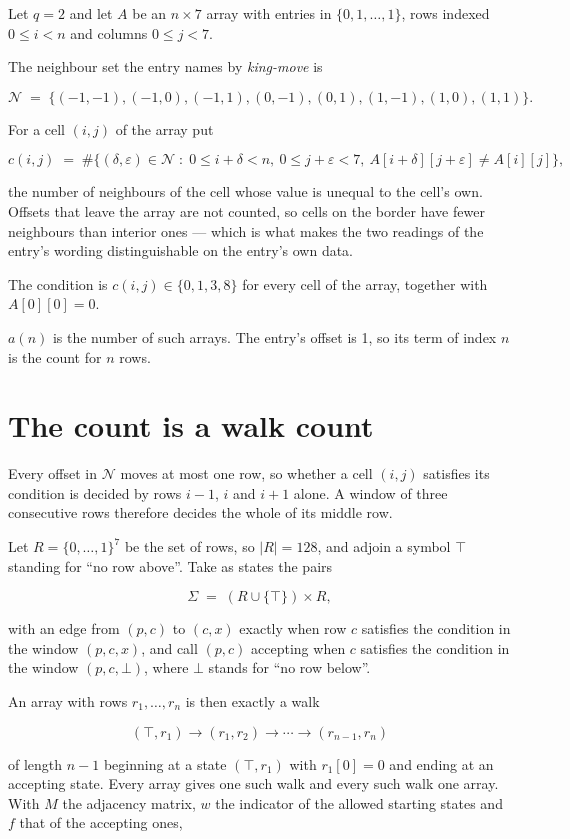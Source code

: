 \documentclass[11pt]{article}
\theoremstyle{definition}
\begin{document}
Let $q = 2$ and let $A$ be an $n \times 7$ array with entries in $\{0,1,\dots,1\}$, rows indexed $0 \le i < n$ and columns $0 \le j < 7$.

The neighbour set the entry names by {\itshape king-move} is

\[\mathcal{N} \;=\; \{(-1,-1), (-1,0), (-1,1), (0,-1), (0,1), (1,-1), (1,0), (1,1)\}.\]

For a cell $(i,j)$ of the array put

\[c(i,j) \;=\; \#\bigl\{(\delta,\varepsilon)\in\mathcal{N} \;:\; 0\le i+\delta<n,\ 0\le j+\varepsilon<7,\ A[i+\delta][j+\varepsilon] \neq A[i][j]\bigr\},\]

the number of neighbours of the cell whose value is unequal to the cell's own. Offsets that leave the array are not counted, so cells on the border have fewer neighbours than interior ones --- which is what makes the two readings of the entry's wording distinguishable on the entry's own data.

The condition is $c(i,j) \in \{0, 1, 3, 8\}$ for every cell of the array, together with $A[0][0]=0$.

$a(n)$ is the number of such arrays. The entry's offset is 1, so its term of index $n$ is the count for $n$ rows.

\section{The count is a walk count}

Every offset in $\mathcal{N}$ moves at most one row, so whether a cell $(i,j)$ satisfies its condition is decided by rows $i-1$, $i$ and $i+1$ alone. A window of three consecutive rows therefore decides the whole of its middle row.

Let $R = \{0,\dots,1\}^{7}$ be the set of rows, so $|R| = 128$, and adjoin a symbol $\top$ standing for ``no row above''. Take as states the pairs

\[\Sigma \;=\; (R \cup \{\top\}) \times R,\]

with an edge from $(p,c)$ to $(c,x)$ exactly when row $c$ satisfies the condition in the window $(p,c,x)$, and call $(p,c)$ accepting when $c$ satisfies the condition in the window $(p,c,\bot)$, where $\bot$ stands for ``no row below''.

An array with rows $r_1,\dots,r_n$ is then exactly a walk

\[(\top,r_1) \to (r_1,r_2) \to \cdots \to (r_{n-1},r_n)\]

of length $n-1$ beginning at a state $(\top,r_1)$ with $r_1[0]=0$ and ending at an accepting state. Every array gives one such walk and every such walk one array. With $M$ the adjacency matrix, $w$ the indicator of the allowed starting states and $f$ that of the accepting ones,
\end{document}
